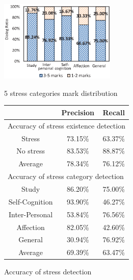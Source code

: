 \begin{figure}
\makeatletter{}\makeatother
\begin{minipage}{.51\textwidth}
\centering
\includegraphics[width=5.5cm]{figs/experimentresult.eps}
\caption{5 stress categories mark distribution}
\label{fig:score}
\end{minipage}
\makeatletter{}\makeatother
\begin{minipage}{.45\textwidth}
\centering
\caption{Accuracy of stress detection}
\begin{tabular}{c|c|c}
\hline
 &Precision&Recall
\\\hline
 \multicolumn{3}{l}{Accuracy of stress existence detection}
\\\hline
Stress &73.15\%&63.37\%
\\\hline
No stress&83.53\%&88.87\%
\\\hline
Average&78.34\%&76.12\%
\\\hline
 \multicolumn{3}{l}{Accuracy of stress category detection}
\\\hline
Study&86.20\%&75.00\%
\\\hline
Self-Cognition&93.90\%&46.27\%
\\\hline
Inter-Personal&53.84\%&76.56\%
\\\hline
Affection&82.05\%&42.60\%
\\\hline
General&30.94\%&76.92\%
\\\hline
Average&69.39\%&63.47\%
\\\hline
\end{tabular}
\label{tab:stress_detection}
\end{minipage}
\end{figure}
